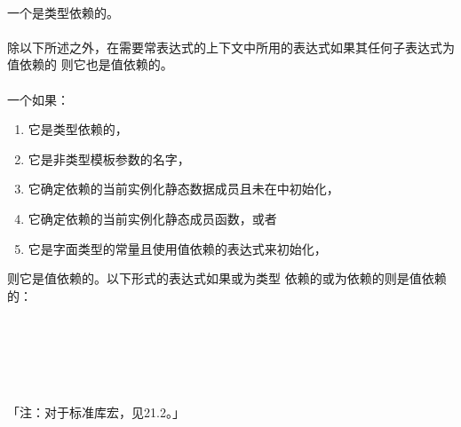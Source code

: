 \paragraph{}
一个是类型依赖的。

\paragraph{}
除以下所述之外，在需要常表达式的上下文中所用的表达式如果其任何子表达式为值依赖的
则它也是值依赖的。

\paragraph{}
一个如果：
\begin{enumerate}
  \item{它是类型依赖的，}
  \item{它是非类型模板参数的名字，}
  \item{它确定依赖的当前实例化静态数据成员且未在中初始化，}
  \item{它确定依赖的当前实例化静态成员函数，或者}
  \item{它是字面类型的常量且使用值依赖的表达式来初始化，}
\end{enumerate}
则它是值依赖的。以下形式的表达式如果或为类型
依赖的或为依赖的则是值依赖的：                                    \\
\mbox{}                              \\
\mbox{}                              \\
\mbox{}                           \\
\mbox{}                              \\
\mbox{}                             \\
\mbox{}

「注：对于标准库宏，见21.2。」

